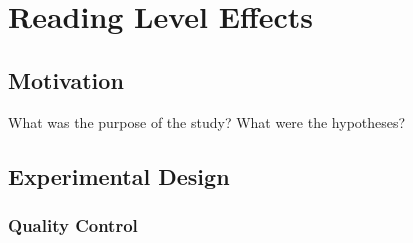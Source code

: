 \chapter{Reading Level Effects}

\section{Motivation}

What was the purpose of the study?
What were the hypotheses? 

\section{Experimental Design}
\subsection{Quality Control}









